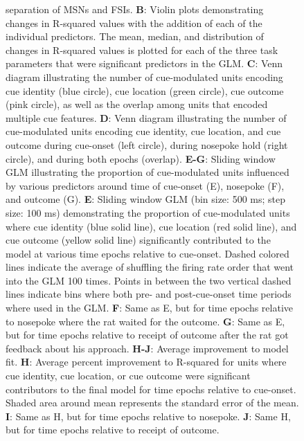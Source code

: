 \documentclass[11pt]{article}
\newcommand{\bsf}[1]{\textbf{#1}}
\begin{document}
\begin{figure}
{separation of MSNs and FSIs. \bsf{B}: Violin plots demonstrating changes in
R-squared values with the addition of each of the individual predictors. The
mean, median, and distribution of changes in R-squared values is plotted for
each of the three task parameters that were significant predictors in the
GLM. \bsf{C}: Venn diagram illustrating the number of cue-modulated units encoding cue identity (blue circle), cue location (green circle), cue outcome (pink circle), as well as the overlap among units that encoded multiple cue features. \bsf{D}: Venn diagram illustrating the number of cue-modulated units encoding cue identity, cue location, and cue outcome during cue-onset (left circle), during nosepoke hold (right circle), and during both epochs (overlap). \bsf{E-G}: Sliding window GLM illustrating the proportion of cue-modulated units influenced by various predictors around time of cue-onset (E), nosepoke (F), and outcome (G). \bsf{E}: Sliding window GLM (bin size: 500 ms; step size: 100 ms) demonstrating the proportion of cue-modulated units where cue identity (blue solid line), cue location (red solid line), and cue outcome (yellow solid line) significantly contributed to the model at various time epochs relative to cue-onset. Dashed colored lines indicate the average of shuffling the firing rate order that went into the GLM 100 times. Points in between the two vertical dashed lines indicate bins where both pre- and post-cue-onset time periods where used in the GLM. \bsf{F}: Same as E, but for time epochs relative to nosepoke where the rat waited for the outcome. \bsf{G}: Same as E, but for time epochs relative to receipt of outcome after the rat got feedback about his approach. \bsf{H-J}: Average improvement to model fit. \bsf{H}: Average percent improvement to R-squared for units where cue identity, cue location, or cue outcome were significant contributors to the final model for time epochs relative to cue-onset. Shaded area around mean represents the standard error of the mean. \bsf{I}: Same as H, but for time epochs relative to nosepoke. \bsf{J}: Same H, but for time epochs relative to receipt of outcome.}
\label{fig:NP_GLM}
\end{figure}
\end{document}
